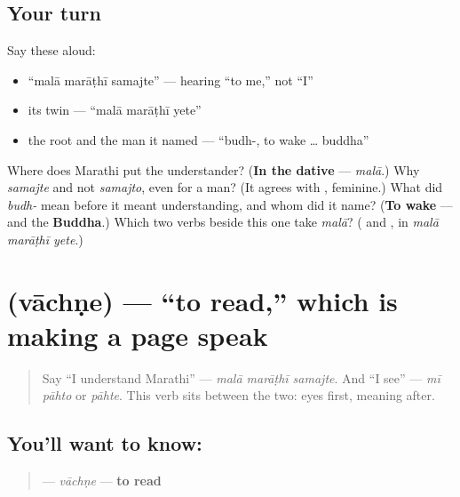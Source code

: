 \subsection*{Your turn}
Say these aloud:

\begin{itemize}
\raggedright
  \item \textquotedblleft{}malā marāṭhī samajte\textquotedblright{} — hearing \textquotedblleft{}to me,\textquotedblright{} not \textquotedblleft{}I\textquotedblright{}
  \item its twin — \textquotedblleft{}malā marāṭhī yete\textquotedblright{}
  \item the root and the man it named — \textquotedblleft{}budh-, to wake … buddha\textquotedblright{}
\end{itemize}

\begin{tcolorbox}[breakable,colback=teal!4,colframe=teal!35!black,title={Before you move on}]
Where does Marathi put the understander? (\textbf{In the dative} — \emph{malā}.) Why \emph{samajte} and not \emph{samajto}, even for a man? (It agrees with \textbf{}, feminine.) What did \emph{budh-} mean before it meant understanding, and whom did it name? (\textbf{To wake} — and the \textbf{Buddha}.) Which two verbs beside this one take \emph{malā}? (\textbf{ } and \textbf{}, in \emph{malā marāṭhī yete}.)
\end{tcolorbox}
\section[vāchṇe]{ (vāchṇe) — \textquotedblleft{}to read,\textquotedblright{} which is making a page speak}

\label{lesson:MR-C08-vachne}



\begin{quote}
Say \textquotedblleft{}I understand Marathi\textquotedblright{} — \emph{malā marāṭhī samajte}. And \textquotedblleft{}I see\textquotedblright{} — \emph{mī pāhto} or \emph{pāhte}. This verb sits between the two: eyes first, meaning after.
\end{quote}

\subsection*{You'll want to know: }
\begin{quote}
\textbf{} — \emph{vāchṇe} — \textbf{to read}
\end{quote}

